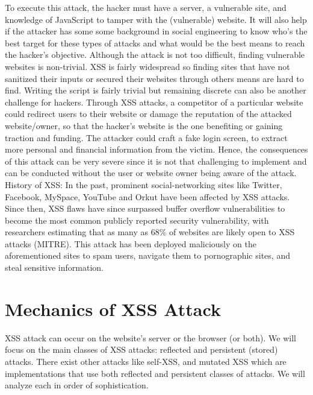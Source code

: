 \documentclass[11pt]{article}
\begin{document}
To execute this attack, the hacker must have a server, a vulnerable site, and knowledge of JavaScript to tamper with the (vulnerable) website. It will also help if the attacker has some some background in social engineering to know who's the best target for these types of attacks and what would be the best means to reach the hacker's objective. Although the attack is not too difficult, finding vulnerable websites is non-trivial. XSS is fairly widespread so finding sites that have not sanitized their inputs or secured their websites through others means are hard to find. Writing the script is fairly trivial but remaining discrete can also be another challenge for hackers. Through XSS attacks, a competitor of a particular website could redirect users to their website or damage the reputation of the attacked website/owner, so that the hacker’s website is the one benefiting or gaining traction and funding. The attacker could craft a fake login screen, to extract more personal and financial information from the victim. Hence, the consequences of this attack can be very severe since it is not that challenging to implement and can be conducted without the user or website owner being aware of the attack. \\

History of XSS: In the past, prominent social-networking sites like Twitter, Facebook, MySpace, YouTube and Orkut have been affected by XSS attacks. Since then, XSS flaws have since surpassed buffer overflow vulnerabilities to become the most common publicly reported security vulnerability, with researchers estimating that as many as 68\% of websites are likely open to XSS attacks (MITRE). This attack has been deployed maliciously on the aforementioned sites to spam users, navigate them to pornographic sites, and steal sensitive information. \\

\section{Mechanics of XSS Attack}

XSS attack can occur on the website's server or the browser (or both). We will focus on the main classes of XSS attacks: reflected and persistent (stored) attacks. There exist other attacks like self-XSS, and mutated XSS which are implementations that use both reflected and persistent classes of attacks. We will analyze each in order of sophistication.\\
\end{document}
